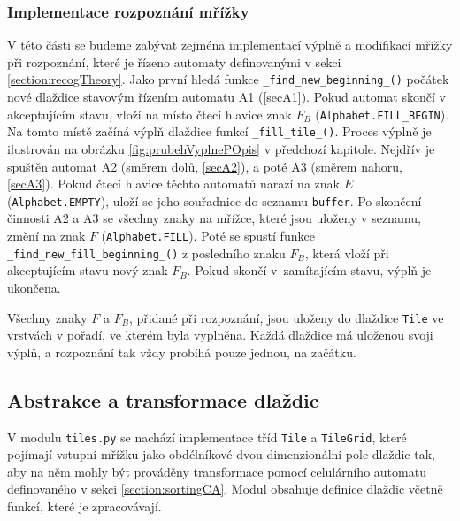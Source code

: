 \subsubsection*{Implementace rozpoznání mřížky}
V této části se budeme zabývat zejména implementací výplně a modifikací mřížky při rozpoznání, které je řízeno automaty definovanými v sekci \ref{section:recogTheory}.  Jako první hledá funkce \verb|_find_new_beginning_()| počátek nové dlaždice stavovým řízením automatu A1 (\ref{secA1}). Pokud automat skončí v akceptujícím stavu, vloží na místo čtecí hlavice znak $F_B$ \linebreak (\verb|Alphabet.FILL_BEGIN|). Na tomto místě začíná výplň dlaždice funkcí \verb|_fill_tile_()|. Proces výplně je ilustrován na obrázku \ref{fig:prubehVyplnePOpis} v předchozí kapitole. Nejdřív je spuštěn automat A2 (směrem dolů, \ref{secA2}), a poté A3 (směrem nahoru, \ref{secA3}). Pokud čtecí hlavice těchto automatů narazí na znak $E$ (\verb|Alphabet.EMPTY|), uloží se jeho souřadnice do seznamu \verb|buffer|. Po skončení činnosti A2 a A3 se všechny znaky na mřížce, které jsou uloženy v seznamu, změní na znak $F$ (\verb|Alphabet.FILL|). Poté se spustí funkce \verb|_find_new_fill_beginning_()| z posledního znaku $F_B$, která vloží při akceptujícím stavu nový znak $F_B$. Pokud skončí v~zamítajícím stavu, výplň je ukončena.

Všechny znaky $F$ a $F_B$, přidané při rozpoznání, jsou uloženy do dlaždice \verb|Tile| ve vrstvách v pořadí, ve kterém byla vyplněna. Každá dlaždice má uloženou svoji výplň, a rozpoznání tak vždy probíhá pouze jednou, na začátku. 

\subsection*{Abstrakce a transformace dlaždic}

V modulu \verb|tiles.py| se nachází implementace tříd \verb|Tile| a \verb|TileGrid|, které pojímají vstupní mřížku jako obdélníkové dvou-dimenzionální pole dlaždic tak, aby na něm mohly být prováděny transformace pomocí celulárního automatu definovaného v sekci \ref{section:sortingCA}. Modul obsahuje definice dlaždic včetně funkcí, které je zpracovávají. 

